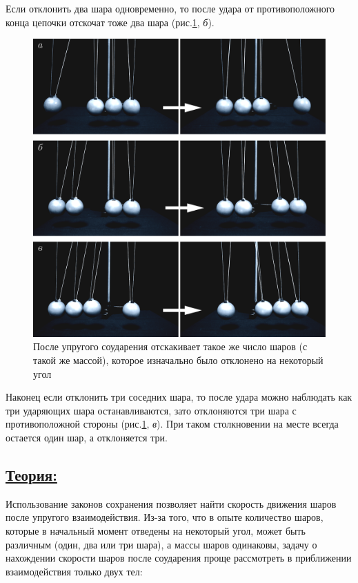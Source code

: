 \documentclass[14pt,a4paper,oneside]{extarticle}	%
\begin{document}
Если отклонить два шара одновременно, то после удара от противоположного конца цепочки отскочат тоже два шара (рис.\ref{impact-3}, \textit{б}).
\begin{figure}[H]
	\centering 	
	\includegraphics[width=0.9\linewidth]{impact-3.png}
	\caption{После упругого соударения отскакивает такое же число шаров (с такой же массой), которое изначально было отклонено на некоторый угол}\label{impact-3}
\end{figure}

Наконец если отклонить три соседних шара, то после удара можно наблюдать как три ударяющих шара останавливаются, зато отклоняются три шара с противоположной стороны (рис.\ref{impact-3}, \textit{в}).
При таком столкновении на месте всегда остается один шар, а отклоняется три. 

\subsection*{\underline{Теория:}}

Использование законов сохранения позволяет найти скорость движения шаров после упругого взаимодействия.
Из-за того, что в опыте количество шаров, которые в начальный момент отведены на некоторый угол, может быть различным (один, два или три шара), а массы шаров одинаковы, задачу о нахождении скорости шаров после соударения проще рассмотреть в приближении взаимодействия только двух тел:
\end{document}
